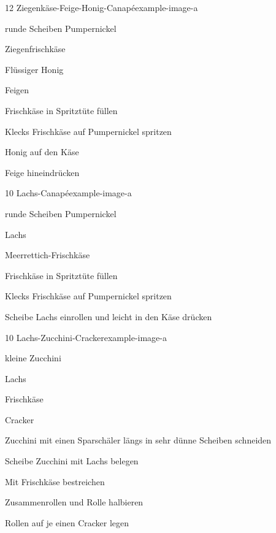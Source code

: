 




\begin{recipe}{12 Ziegenkäse-Feige-Honig-Canapé}{example-image-a}{
    \item[12] runde Scheiben Pumpernickel
    \item[200 g] Ziegenfrischkäse
    \item[etwas] Flüssiger Honig
    \item[2] Feigen
  }

  \item Frischkäse in Spritztüte füllen
  \item Klecks Frischkäse auf Pumpernickel spritzen
  \item Honig auf den Käse
  \item {} Feige hineindrücken
\end{recipe}


\begin{recipe}{10 Lachs-Canapé}{example-image-a}{
    \item[10] runde Scheiben Pumpernickel
    \item[200 g] Lachs
    \item[200 g] Meerrettich-Frischkäse
  }

  \item Frischkäse in Spritztüte füllen
  \item Klecks Frischkäse auf Pumpernickel spritzen
  \item Scheibe Lachs einrollen und leicht in den Käse drücken
\end{recipe}

\begin{recipe}{10 Lachs-Zucchini-Cracker}{example-image-a}{
    \item[1] kleine Zucchini
    \item[200 g] Lachs
    \item[200 g] Frischkäse
    \item[10] Cracker
  }

  \item Zucchini mit einen Sparschäler längs in sehr dünne Scheiben schneiden
  \item Scheibe Zucchini mit Lachs belegen
  \item Mit Frischkäse bestreichen
  \item Zusammenrollen und Rolle halbieren
  \item Rollen auf je einen Cracker legen
\end{recipe}


